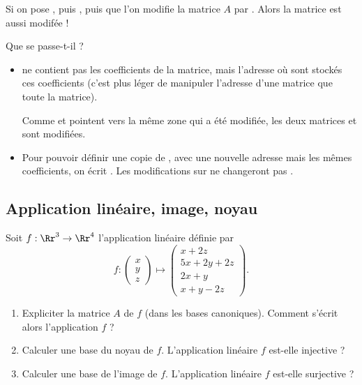 \documentclass[class=report,crop=false]{standalone}
\begin{document}
\begin{remarque*}
Si on pose 
, puis ,
puis que l'on modifie la matrice $A$ par . 
Alors la matrice  est aussi modifée !

Que se passe-t-il ?
\begin{itemize}
  \item {} ne contient pas les coefficients de la matrice, mais 
  l'adresse où sont stockés ces coefficients (c'est plus léger de manipuler 
  l'adresse d'une matrice que toute la matrice).
  
  Comme  et  pointent 
  vers la même zone qui a été modifiée, 
  les deux matrices  et  sont modifiées.
  
  \item Pour pouvoir définir une copie de , avec une nouvelle 
  adresse mais les mêmes coefficients, on écrit .
  Les modifications sur  ne changeront pas .
\end{itemize}
\end{remarque*}

\subsection{Application linéaire, image, noyau}



\begin{tp}
Soit $f : \Rr^3 \to \Rr^4$ l'application linéaire définie par
$$f : \begin{pmatrix}x\\y\\z\end{pmatrix}
\longmapsto 
\begin{pmatrix}
x+2z\\
5x+2y+2z\\
2x+y\\
x+y-2z
\end{pmatrix}.$$
\begin{enumerate}
  \item Expliciter la matrice $A$ de $f$ (dans les bases canoniques).
  Comment s'écrit alors l'application $f$ ?
    
  \item Calculer une base du noyau de $f$. L'application linéaire
  $f$ est-elle injective ?
  
  \item Calculer une base de l'image de $f$. L'application linéaire
  $f$ est-elle surjective ?
\end{enumerate}
\end{tp}
\end{document}
